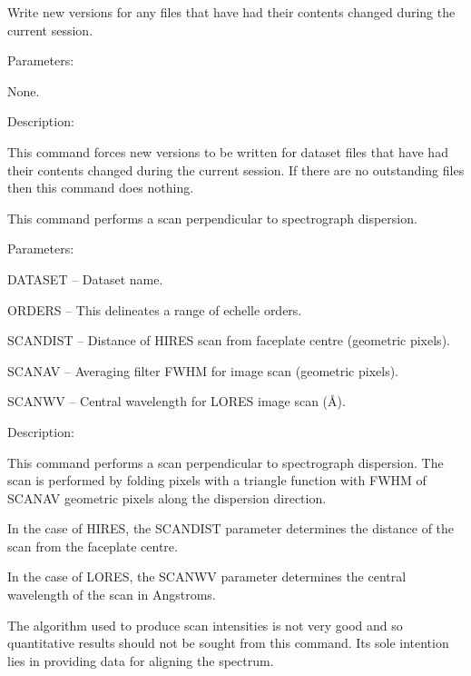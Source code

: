 \begin {description}
\item [SAVE]
Write new versions for any files that have had their contents
changed during the current session.

\begin {description}
\item Parameters:

\begin {description}
\item None.
\end {description}

\item Description:

This command forces new versions to be written for dataset files
that have had their contents changed during the current session.
If there are no outstanding files then this command does nothing.
\end {description}

\item [SCAN]
This command performs a scan perpendicular to spectrograph 
dispersion.

\begin {description}
\item Parameters:

\begin {description}
\item DATASET -- Dataset name.
\item ORDERS -- This delineates a range of echelle orders.
\item SCANDIST -- Distance of HIRES scan from faceplate centre (geometric 
pixels).
\item SCANAV -- Averaging filter FWHM for image scan (geometric pixels).
\item SCANWV -- Central wavelength for LORES image scan (\AA).
\end {description}

\item Description:

This command performs a scan perpendicular to spectrograph dispersion.
The scan is performed by folding pixels with a triangle function
with FWHM of SCANAV geometric pixels along the dispersion direction.

In the case of HIRES, the SCANDIST parameter determines the distance
of the scan from the faceplate centre.

In the case of LORES, the SCANWV parameter determines the central wavelength
of the scan in Angstroms.

The algorithm used to produce scan intensities is not very good
and so quantitative results should not be sought from this command.
Its sole intention lies in providing data for aligning the spectrum.
\end {description}


\end{description}
